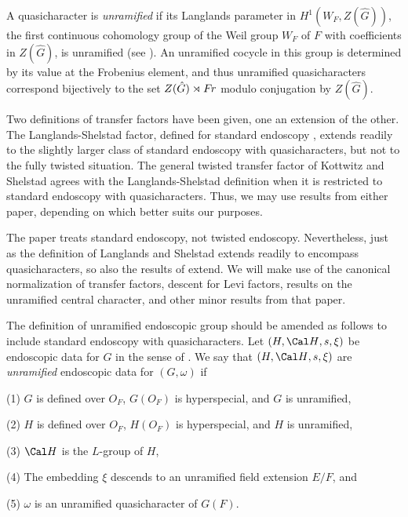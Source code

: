 A quasicharacter is {\it unramified} if its Langlands
parameter in $H^1(W_F,Z(\hat G))$,
the first continuous
cohomology group of the Weil group $W_F$ of $F$ with coefficients
in $Z(\hat G)$, 
is unramified (see \cite{B}).  An unramified cocycle in this group is
determined by its value at the Frobenius element, and
thus unramified quasicharacters correspond bijectively
to the set $Z(\hat G)\rtimes \text{$F\hskip-.1em r$}$ modulo conjugation by $Z(\hat G)$.

Two definitions of transfer factors have been given, one
an extension of the other.  The Langlands-Shelstad factor,
defined for standard endoscopy \cite{LS1}, extends
readily to the slightly larger class of standard endoscopy
with quasicharacters, but not to the fully twisted situation.
The general twisted transfer factor of Kottwitz and Shelstad
\cite{KS1} agrees with the Langlands-Shelstad definition
when it is restricted to standard endoscopy with quasicharacters.
Thus, we may use results from either paper, depending on
which better suits our purposes.

The paper \cite{H2} treats standard endoscopy, not
twisted endoscopy.  Nevertheless, just as the definition
of Langlands and Shelstad extends readily to encompass
quasicharacters, so also the results of \cite{H2} extend.
We will make use of the canonical normalization of
transfer factors, descent for Levi factors, results
on the unramified central character, and other
minor results from that paper.

The definition of unramified endoscopic group should be
amended as follows to include standard endoscopy with
quasicharacters.  Let $(H,{\Cal H},s,\xi)$ be endoscopic
data for $G$ in the sense of \cite{KS1}.  We say that
$(H,{\Cal H},s,\xi)$ are {\it unramified} endoscopic data
for $(G,\omega)$ if
  \item{(1)} $G$ is defined over $O_F$, $G(O_F)$ is hyperspecial,
and $G$ is unramified,

\item{(2)} $H$ is defined over $O_F$, $H(O_F)$ is hyperspecial,
and $H$ is unramified,

\item{(3)} ${\Cal H}$ is the $L$-group of $H$,

\item{(4)} The embedding $\xi$ descends to an unramified
field extension $E/F$, and

\item{(5)}  $\omega$ is an unramified quasicharacter of
$G(F)$.

